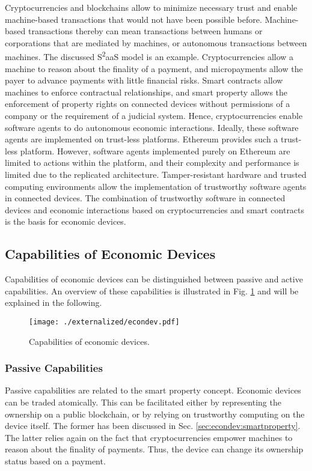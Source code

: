 Cryptocurrencies and blockchains allow to minimize necessary trust and enable machine-based transactions that would not have been possible before. 
Machine-based transactions thereby can mean transactions between humans or corporations that are mediated by machines, or autonomous transactions between machines. The discussed S\textsuperscript{2}aaS model is an example. Cryptocurrencies allow a machine to reason about the finality of a payment, and micropayments allow the payer to advance payments with little financial risks. Smart contracts allow machines to enforce contractual relationships, and smart property allows the enforcement of property rights on connected devices without permissions of a company or the requirement of a judicial system. 
Hence, cryptocurrencies enable software agents to do autonomous economic interactions. Ideally, these software agents are implemented on trust-less platforms. Ethereum provides such a trust-less platform. However, software agents implemented purely on Ethereum are limited to actions within the platform, and their complexity and performance is limited due to the replicated architecture. Tamper-resistant hardware and trusted computing environments allow the implementation of trustworthy software agents in connected devices. The combination of trustworthy software in connected devices and economic interactions based on cryptocurrencies and smart contracts is the basis for economic devices.

\subsection{Capabilities of Economic Devices}

Capabilities of economic devices can be distinguished between passive and active capabilities. An overview of these capabilities is illustrated in Fig. \ref{fig:econdev} and will be explained in the following.

\begin{figure}
\centering
\texttt{[image: ./externalized/econdev.pdf]}
\caption{Capabilities of economic devices.}
\label{fig:econdev}
\end{figure}

\subsubsection{Passive Capabilities}

Passive capabilities are related to the smart property concept.
Economic devices can be traded atomically. This can be facilitated either by representing the ownership on a public blockchain, or by relying on trustworthy computing on the device itself. The former has been discussed in Sec. \ref{sec:econdev:smartproperty}. The latter relies again on the fact that cryptocurrencies empower machines to reason about the finality of payments. Thus, the device can change its ownership status based on a payment. 

